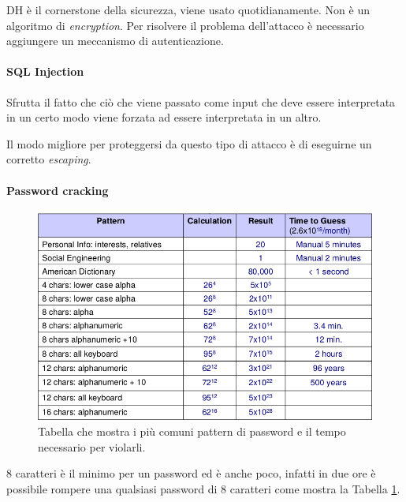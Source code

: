 DH è il cornerstone della sicurezza, viene usato quotidianamente. Non è un
algoritmo di \textit{encryption}.
Per risolvere il problema dell'attacco è necessario aggiungere un meccanismo di
autenticazione.

\paragraph{SQL Injection}

Sfrutta il fatto che ciò che viene passato come input che deve essere
interpretata in un certo modo viene forzata ad essere interpretata in un altro.

Il modo migliore per proteggersi da questo tipo di attacco è di eseguirne un
corretto \textit{escaping}.

\paragraph{Password cracking}

\begin{figure}[h!]
        \begin{center}

\includegraphics[scale=0.65]{res/img/password_cracking_table.png}
        \end{center}
        \caption{Tabella che mostra i più comuni pattern di password e il tempo
necessario per violarli.}
        \label{fig:password:cracking:table}
\end{figure}

8 caratteri è il minimo per un password ed è anche poco, infatti in due ore è
possibile rompere una qualsiasi password di 8 caratteri come mostra la Tabella
\ref{fig:password:cracking:table}.
